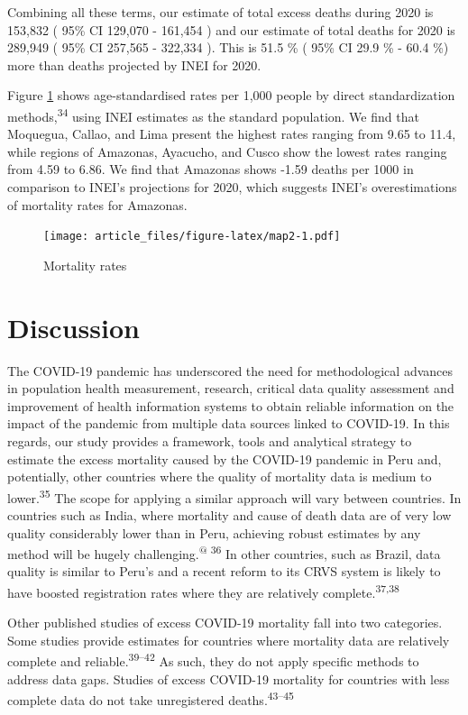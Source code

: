 \documentclass[
]{article}
\begin{document}
Combining all these terms, our estimate of total excess deaths during 2020 is 153,832 ( 95\% CI 129,070 - 161,454 ) and our estimate of total deaths for 2020 is 289,949 ( 95\% CI 257,565 - 322,334 ). This is 51.5 \% ( 95\% CI 29.9 \% - 60.4 \%) more than deaths projected by INEI for 2020.

Figure \ref{fig:map2} shows age-standardised rates per 1,000 people by direct standardization methods,\textsuperscript{34} using INEI estimates as the standard population. We find that Moquegua, Callao, and Lima present the highest rates ranging from 9.65 to 11.4, while regions of Amazonas, Ayacucho, and Cusco show the lowest rates ranging from 4.59 to 6.86. We find that Amazonas shows -1.59 deaths per 1000 in comparison to INEI's projections for 2020, which suggests INEI's overestimations of mortality rates for Amazonas.

\begin{figure}
\centering
\texttt{[image: article\_files/figure-latex/map2-1.pdf]}
\caption{\label{fig:map2}Mortality rates}
\end{figure}

\hypertarget{discussion}{%
\section{Discussion}\label{discussion}}

The COVID-19 pandemic has underscored the need for methodological advances in population health measurement, research, critical data quality assessment and improvement of health information systems to obtain reliable information on the impact of the pandemic from multiple data sources linked to COVID-19. In this regards, our study provides a framework, tools and analytical strategy to estimate the excess mortality caused by the COVID-19 pandemic in Peru and, potentially, other countries where the quality of mortality data is medium to lower.\textsuperscript{35} The scope for applying a similar approach will vary between countries. In countries such as India, where mortality and cause of death data are of very low quality considerably lower than in Peru, achieving robust estimates by any method will be hugely challenging.\textsuperscript{@ 36} In other countries, such as Brazil, data quality is similar to Peru's and a recent reform to its CRVS system is likely to have boosted registration rates where they are relatively complete.\textsuperscript{37,38}

Other published studies of excess COVID-19 mortality fall into two categories. Some studies provide estimates for countries where mortality data are relatively complete and reliable.\textsuperscript{39--42} As such, they do not apply specific methods to address data gaps. Studies of excess COVID-19 mortality for countries with less complete data do not take unregistered deaths.\textsuperscript{43--45}
\end{document}
